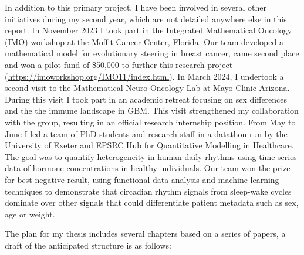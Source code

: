 \documentclass[
  letterpaper,
]{scrreprt}
\theoremstyle{definition}
\theoremstyle{remark}
\begin{document}
In addition to this primary project, I have been involved in several
other initiatives during my second year, which are not detailed anywhere
else in this report. In November 2023 I took part in the Integrated
Mathematical Oncology (IMO) workshop at the Moffit Cancer Center,
Florida. Our team developed a mathematical model for evolutionary
steering in breast cancer, came second place and won a pilot fund of
\$50,000 to further this research project
(\url{https://imoworkshop.org/IMO11/index.html}). In March 2024, I
undertook a second visit to the Mathematical Neuro-Oncology Lab at Mayo
Clinic Arizona. During this visit I took part in an academic retreat
focusing on sex differences and the the immune landscape in GBM. This
visit strengthened my collaboration with the group, resulting in an
official research internship position. From May to June I led a team of
PhD students and research staff in a
\href{(\%3Chttps://wolfbyttner.github.io/exeter-quantitative-modelling/\%3E)}{datathon}
run by the University of Exeter and EPSRC Hub for Quantitative Modelling
in Healthcare. The goal was to quantify heterogeneity in human daily
rhythms using time series data of hormone concentrations in healthy
individuals. Our team won the prize for best negative result, using
functional data analysis and machine learning techniques to demonstrate
that circadian rhythm signals from sleep-wake cycles dominate over other
signals that could differentiate patient metadata such as sex, age or
weight.

The plan for my thesis includes several chapters based on a series of
papers, a draft of the anticipated structure is as follows:
\end{document}
